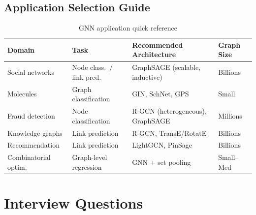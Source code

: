 \subsection{Application Selection Guide}

\begin{table}[H]
\centering
\caption{GNN application quick reference}
\begin{tabularx}{\textwidth}{lXXl}
\toprule
\textbf{Domain} & \textbf{Task} & \textbf{Recommended Architecture} & \textbf{Graph Size} \\
\midrule
Social networks & Node class.\ / link pred. & GraphSAGE (scalable, inductive) & Billions \\
Molecules & Graph classification & GIN, SchNet, GPS & Small \\
Fraud detection & Node classification & R-GCN (heterogeneous), GraphSAGE & Millions \\
Knowledge graphs & Link prediction & R-GCN, TransE/RotatE & Billions \\
Recommendation & Link prediction & LightGCN, PinSage & Billions \\
Combinatorial optim. & Graph-level regression & GNN + set pooling & Small--Med \\
\bottomrule
\end{tabularx}
\end{table}

\section{Interview Questions}
\label{sec:gnn_interview}

